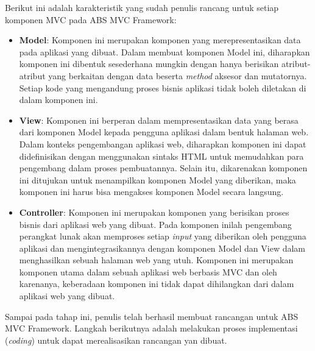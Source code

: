 Berikut ini adalah karakteristik yang sudah penulis rancang untuk setiap komponen MVC pada ABS MVC Framework:

\begin{itemize}
    \item \textbf{Model}: Komponen ini merupakan komponen yang merepresentasikan data pada aplikasi yang dibuat. Dalam membuat komponen Model ini, diharapkan komponen ini dibentuk sesederhana mungkin dengan hanya berisikan atribut-atribut yang berkaitan dengan data beserta \textit{method} aksesor dan mutatornya. Setiap kode yang mengandung proses bisnis aplikasi tidak boleh diletakan di dalam komponen ini.
    \item \textbf{View}: Komponen ini berperan dalam mempresentasikan data yang berasa dari komponen Model kepada pengguna aplikasi dalam bentuk halaman web. Dalam konteks pengembangan aplikasi web, diharapkan komponen ini dapat didefinisikan dengan menggunakan sintaks HTML untuk memudahkan para pengembang dalam proses pembuatannya. Selain itu, dikarenakan komponen ini ditujukan untuk menampilkan komponen Model yang diberikan, maka komponen ini harus bisa mengakses komponen Model secara langsung.
    \item \textbf{Controller}: Komponen ini merupakan komponen yang berisikan proses bisnis dari aplikasi web yang dibuat. Pada komponen inilah pengembang perangkat lunak akan memproses setiap \textit{input} yang diberikan oleh pengguna aplikasi dan mengintegrasikannya dengan komponen Model dan View dalam menghasilkan sebuah halaman web yang utuh. Komponen ini merupakan komponen utama dalam sebuah aplikasi web berbasis MVC dan oleh karenanya, keberadaan komponen ini tidak dapat dihilangkan dari dalam aplikasi web yang dibuat.
\end{itemize}

Sampai pada tahap ini, penulis telah berhasil membuat rancangan untuk ABS MVC Framework. Langkah berikutnya adalah melakukan proses implementasi (\textit{coding}) untuk dapat merealisasikan rancangan yan dibuat.
